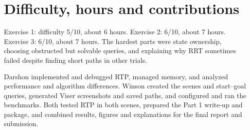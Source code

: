 \documentclass{comp450}
\begin{document}


\section*{Difficulty, hours and contributions}
Exercise 1: difficulty 5/10, about 6 hours. Exercise 2: 6/10, about 7 hours. Exercise 3: 6/10, about 7 hours. The hardest parts were state ownership, choosing obstructed but solvable queries, and explaining why RRT sometimes failed despite finding short paths in other trials.

Darshon implemented and debugged RTP, managed memory, and analyzed performance and algorithm differences. Winson created the scenes and start--goal queries, generated Viser screenshots and saved paths, and configured and ran the benchmarks. Both tested RTP in both scenes, prepared the Part 1 write-up and package, and combined results, figures and explanations for the final report and submission.
\end{document}
